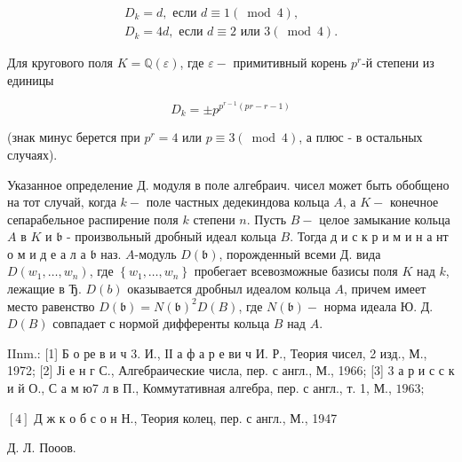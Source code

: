 \documentclass[10pt]{article}
\begin{document}
\[

\begin{gathered}

D_{k}=d, \text { если } d \equiv 1(\bmod 4), \\

D_{k}=4 d, \text { если } d \equiv 2 \text { или } 3(\bmod 4) .

\end{gathered}

\]



Для кругового поля $K=\mathbb{Q}(\varepsilon)$, где $\varepsilon-$ примитивный корень $p^{r}$-й степени из единицы



\[

D_{k}= \pm p^{p^{r-1}(p r-r-1)}

\]



(знак минус берется при $p^{r}=4$ или $p \equiv 3(\bmod 4)$, а плюс - в остальных случаях).



Указанное определение Д. модуля в поле алгебраич. чисел может быть обобщено на тот случай, когда $k-$ поле частных дедекиндова кольца $A$, а $K-$ конечное сепарабельное распирение поля $k$ степени $n$. Пусть $B-$ целое замыкание кольца $A$ в $K$ и $\mathfrak{b}$ - произвольный дробный идеал кольца $B$. Тогда д и с к р и м и н а нт о м и д е а л а $\mathfrak{b}$ наз. $A$-модуль $D(\mathfrak{b})$, порожденный всеми Д. вида $D\left(w_{1}, \ldots, w_{n}\right)$, где $\left\{w_{1}, \ldots, w_{n}\right\}$ пробегает всевозможные базисы поля $K$ над $k$, лежащие в Ђ. $D(b)$ оказывается дробныл идеалом кольца $A$, причем имеет место равенство $D(\mathfrak{b})=N(\mathfrak{b})^{2} D(B)$, где $N(\mathfrak{b})-$ норма идеала Ю. Д. $D(B)$ совпадает с нормой дифференты кольца $B$ над $A$.



IInm.: [1] Б о ре в и ч 3. И., ІІ а ф а р е ви ч И. Р., Теория чисел, 2 изд., М., 1972; [2] Јі е н г С., Алгебраические числа, пер. с англ., М., 1966; [3] 3 а р и с с к и й О., С а м ю7 л в П., Коммутативная алгебра, пер. с англ., т. 1, М., $1963 ;$

$[4]$ Д ж к о б с о н Н., Теория колец, пер. с англ., М., 1947



Д. Л. Пооов.
\end{document}

